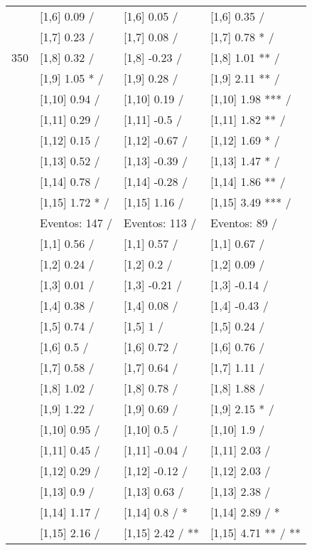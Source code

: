 \begin{table}
\begin{tabular}[t]{llll}
 & {}[1,6] 0.09  / & {}[1,6] 0.05  / & {}[1,6] 0.35  /\\
 & {}[1,7] 0.23  / & {}[1,7] 0.08  / & {}[1,7] 0.78 * /\\
350 & {}[1,8] 0.32  / & {}[1,8] -0.23  / & {}[1,8] 1.01 ** /\\
\addlinespace
 & {}[1,9] 1.05 * / & {}[1,9] 0.28  / & {}[1,9] 2.11 ** /\\
 & {}[1,10] 0.94  / & {}[1,10] 0.19  / & {}[1,10] 1.98 *** /\\
 & {}[1,11] 0.29  / & {}[1,11] -0.5  / & {}[1,11] 1.82 ** /\\
 & {}[1,12] 0.15  / & {}[1,12] -0.67  / & {}[1,12] 1.69 * /\\
 & {}[1,13] 0.52  / & {}[1,13] -0.39  / & {}[1,13] 1.47 * /\\
\addlinespace
 & {}[1,14] 0.78  / & {}[1,14] -0.28  / & {}[1,14] 1.86 ** /\\
 & {}[1,15] 1.72 * / & {}[1,15] 1.16  / & {}[1,15] 3.49 *** /\\
 & Eventos:  147 / & Eventos:  113 / & Eventos:  89 /\\
 & {}[1,1] 0.56  / & {}[1,1] 0.57  / & {}[1,1] 0.67  /\\
 & {}[1,2] 0.24  / & {}[1,2] 0.2  / & {}[1,2] 0.09  /\\
\addlinespace
 & {}[1,3] 0.01  / & {}[1,3] -0.21  / & {}[1,3] -0.14  /\\
 & {}[1,4] 0.38  / & {}[1,4] 0.08  / & {}[1,4] -0.43  /\\
 & {}[1,5] 0.74  / & {}[1,5] 1  / & {}[1,5] 0.24  /\\
 & {}[1,6] 0.5  / & {}[1,6] 0.72  / & {}[1,6] 0.76  /\\
 & {}[1,7] 0.58  / & {}[1,7] 0.64  / & {}[1,7] 1.11  /\\
\addlinespace
500 & {}[1,8] 1.02  / & {}[1,8] 0.78  / & {}[1,8] 1.88  /\\
 & {}[1,9] 1.22  / & {}[1,9] 0.69  / & {}[1,9] 2.15 * /\\
 & {}[1,10] 0.95  / & {}[1,10] 0.5  / & {}[1,10] 1.9  /\\
 & {}[1,11] 0.45  / & {}[1,11] -0.04  / & {}[1,11] 2.03  /\\
 & {}[1,12] 0.29  / & {}[1,12] -0.12  / & {}[1,12] 2.03  /\\
\addlinespace
 & {}[1,13] 0.9  / & {}[1,13] 0.63  / & {}[1,13] 2.38  /\\
 & {}[1,14] 1.17  / & {}[1,14] 0.8  / * & {}[1,14] 2.89  / *\\
 & {}[1,15] 2.16  / & {}[1,15] 2.42  / ** & {}[1,15] 4.71 ** / **\\
\bottomrule
\end{tabular}
\end{table}

